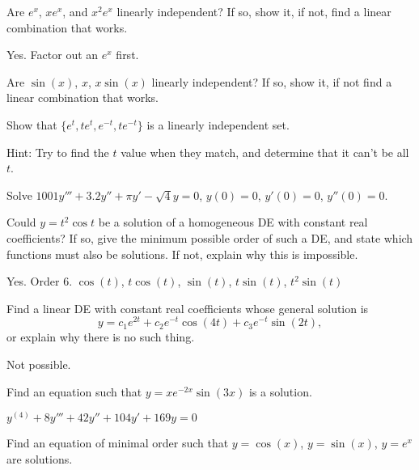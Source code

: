 \begin{exercise}
Are $e^x$, $xe^x$, and $x^2e^x$
linearly independent?  If so, show
it, if not, find a linear combination that works.
\end{exercise}
\comboSol{%
}
{%
Yes. Factor out an $e^x$ first.
}

\begin{exercise}\ansMark%
Are $\sin(x)$, $x$, $x\sin(x)$ linearly independent?
If so, show it, if not find a linear combination that works.
\end{exercise}

\begin{exercise}
Show that $\{e^t, te^t, e^{-t}, te^{-t}\}$ is a linearly independent set.
\end{exercise}
\comboSol{%
}
{%
Hint: Try to find the $t$ value when they match, and determine that it can't be all $t$. 
}

\begin{exercise}\ansMark%
Solve $1001y'''+3.2y''+\pi y'-\sqrt{4} y = 0$, $y(0)=0$, $y'(0) = 0$,
$y''(0) = 0$.
\end{exercise}

\begin{exercise}
Could $y=t^2\cos t$ be a solution of a homogeneous DE with constant real coefficients? %
If so, give the minimum possible order of such a DE, and state which functions must also be solutions. If not, explain why this is impossible.
\end{exercise}
\comboSol{%
}
{%
Yes. Order 6. $\cos(t)$, $t\cos(t)$, $\sin(t)$, $t\sin(t)$, $t^2\sin(t)$
}

\begin{exercise}
Find a linear DE with constant real coefficients whose general solution is $$y=c_1e^{2t}+ c_2e^{-t}\cos(4t) + c_3e^{-t}\sin(2t),$$ %
or explain why there is no such thing.
\end{exercise}
\comboSol{%
}
{%
Not possible.
}

\begin{exercise}
Find an equation such that $y=xe^{-2x}\sin(3x)$ is a solution.
\end{exercise}
\comboSol{%
}
{%
$y^{(4)} + 8y''' + 42y'' + 104y' + 169y = 0$
}

\begin{exercise}\ansMark%
Find an equation of minimal order such that $y=\cos(x)$, $y=\sin(x)$, $y=e^x$ are solutions.
\end{exercise}

